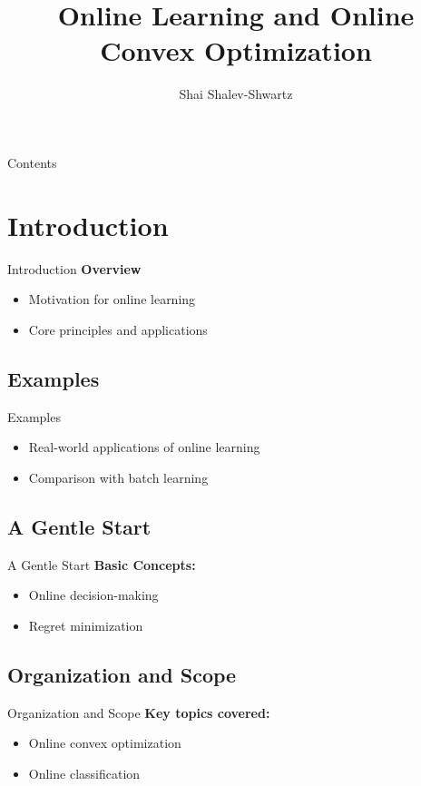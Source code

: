\documentclass{beamer}
\title{Online Learning and Online Convex Optimization}
\author{Shai Shalev-Shwartz}
\date{}
\begin{document}
\frame{\titlepage}

\begin{frame}{Contents}
\tableofcontents
\end{frame}

\section{Introduction}
\begin{frame}{Introduction}
    \textbf{Overview}
    \begin{itemize}
        \item Motivation for online learning
        \item Core principles and applications
    \end{itemize}
\end{frame}

\subsection{Examples}
\begin{frame}{Examples}
    \begin{itemize}
        \item Real-world applications of online learning
        \item Comparison with batch learning
    \end{itemize}
\end{frame}

\subsection{A Gentle Start}
\begin{frame}{A Gentle Start}
    \textbf{Basic Concepts:}
    \begin{itemize}
        \item Online decision-making
        \item Regret minimization
    \end{itemize}
\end{frame}

\subsection{Organization and Scope}
\begin{frame}{Organization and Scope}
    \textbf{Key topics covered:}
    \begin{itemize}
        \item Online convex optimization
        \item Online classification
    \end{itemize}
\end{frame}
\end{document}
